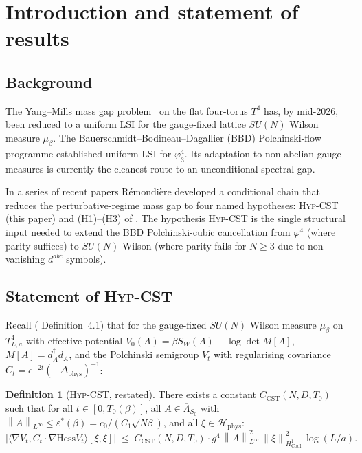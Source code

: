 \documentclass[11pt,a4paper]{amsart}
\theoremstyle{definition}
\newtheorem{definition}[theorem]{Definition}
\newcommand{\norm}[1]{\left\lVert#1\right\rVert}
\newcommand{\Coul}{\mathrm{Coul}}
\newcommand{\Hess}{\mathrm{Hess}}
\newcommand{\HypCST}{\textsc{Hyp-CST}}
\begin{document}
\section{Introduction and statement of results}\label{sec:intro}

\subsection{Background}

The Yang--Mills mass gap problem~\cite{JaffeWitten2000} on the flat
four-torus $T^4$ has, by mid-2026, been reduced to a uniform LSI for
the gauge-fixed lattice $SU(N)$ Wilson measure $\mu_\beta$. The
Bauerschmidt--Bodineau--Dagallier (BBD) Polchinski-flow programme
\cite{BauerschmidtBodineauDagallier2024,BauerschmidtDagallier2024}
established uniform LSI for $\varphi^4_3$. Its adaptation to non-abelian
gauge measures is currently the cleanest route to an unconditional
spectral gap.

In a series of recent papers \cite{RemondiereKRFP3_2026,
RemondiereKRFPBakryEmery_2026, RemondiereFPHess_2026,
RemondiereClosure2026} R\'emondi\`ere developed a conditional chain
that reduces the perturbative-regime mass gap to four named
hypotheses: \HypCST{} (this paper) and (H1)--(H3) of
\cite{RemondiereKRFP3_2026}. The hypothesis \HypCST{} is the single
structural input needed to extend the BBD Polchinski-cubic
cancellation from $\varphi^4$ (where parity suffices) to $SU(N)$
Wilson (where parity fails for $N\geq 3$ due to non-vanishing
$d^{abc}$ symbols).

\subsection{Statement of \HypCST{}}

Recall (\cite{RemondiereClosure2026} Definition~4.1) that for the
gauge-fixed $SU(N)$ Wilson measure $\mu_\beta$ on $T^4_{L,a}$ with
effective potential $V_0(A) = \beta S_W(A) - \log\det M[A]$,
$M[A] = d_A^\dagger d_A$, and the Polchinski semigroup
$V_t$ with regularising covariance $C_t = e^{-2t}(-\Delta_{\mathrm{phys}})^{-1}$:

\begin{definition}[\HypCST{}, restated]\label{def:HypCST}
There exists a constant $C_{\mathrm{CST}}(N, D, T_0)$ such that for all
$t \in [0, T_0(\beta)]$, all $A \in \overline\Lambda_{S_0}$ with
$\norm{A}_{L^\infty} \leq \varepsilon^*(\beta) = c_0/(C_1\sqrt{N\beta})$,
and all $\xi \in \mathcal H_{\mathrm{phys}}$:
\[
\bigl|\langle \nabla V_t, C_t \cdot \nabla \Hess V_t\rangle [\xi, \xi]\bigr|
\;\leq\; C_{\mathrm{CST}}(N, D, T_0) \cdot g^4\, \norm{A}^2_{L^\infty}\, \norm{\xi}^2_{H^1_{\Coul}}\, \log(L/a).
\]
\end{definition}
\end{document}
